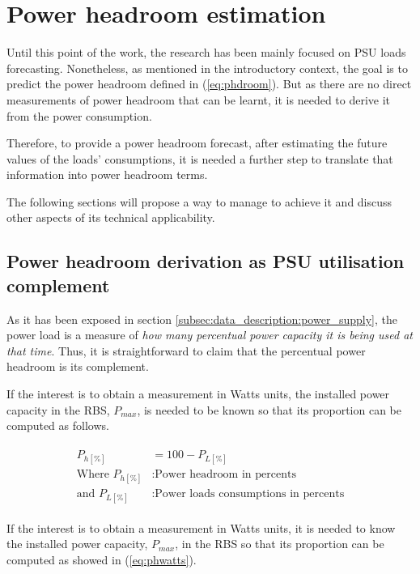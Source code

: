 
\chapter{Power headroom estimation}

Until this point of the work, the research has been mainly focused on PSU loads forecasting. Nonetheless, as mentioned in the introductory context, the goal is to predict the power headroom defined in (\ref{eq:phdroom}). But as there are no direct measurements of power headroom that can be learnt, it is needed to derive it from the power consumption. 

Therefore, to provide a power headroom forecast, after estimating the future values of the loads' consumptions, it is needed a further step to translate that information into power headroom terms.

The following sections will propose a way to manage to achieve it and discuss other aspects of its technical applicability.

\section{Power headroom derivation as PSU utilisation complement}

As it has been exposed in section \ref{subsec:data_description:power_supply}, the power load is a measure of \emph{how many percentual power capacity it is being used at that time}. Thus, it is straightforward to claim that the percentual power headroom is its complement.

If the interest is to obtain a measurement in Watts units, the installed power capacity in the RBS, $P_{max}$, is needed to be known so that its proportion can be computed as follows.

\begin{align}\label{eq:ph_deriv}
\begin{split}
		P_{h[\%]}	&= 100 - P_{L[\%]} \\
		\text{Where }P_{h[\%]}	&: \text{Power headroom in percents} \\
		\text{and } P_{L[\%]}	&: \text{Power loads consumptions in percents}
\end{split}
\end{align}

If the interest is to obtain a measurement in Watts units, it is needed to know the installed power capacity, $P_{max}$, in the RBS so that its proportion can be computed as showed in (\ref{eq:phwatts}).

